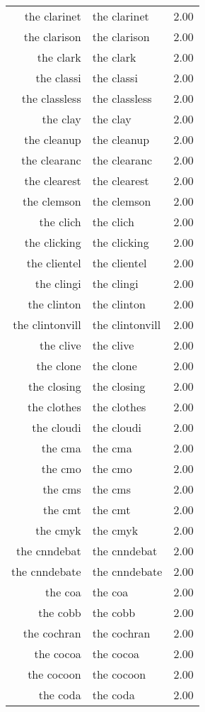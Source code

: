 \begin{table}[ht]
\begin{tabular}{rlr}
  the clarinet & the clarinet & 2.00 \\ 
  the clarison & the clarison & 2.00 \\ 
  the clark & the clark & 2.00 \\ 
  the classi & the classi & 2.00 \\ 
  the classless & the classless & 2.00 \\ 
  the clay & the clay & 2.00 \\ 
  the cleanup & the cleanup & 2.00 \\ 
  the clearanc & the clearanc & 2.00 \\ 
  the clearest & the clearest & 2.00 \\ 
  the clemson & the clemson & 2.00 \\ 
  the clich & the clich & 2.00 \\ 
  the clicking & the clicking & 2.00 \\ 
  the clientel & the clientel & 2.00 \\ 
  the clingi & the clingi & 2.00 \\ 
  the clinton & the clinton & 2.00 \\ 
  the clintonvill & the clintonvill & 2.00 \\ 
  the clive & the clive & 2.00 \\ 
  the clone & the clone & 2.00 \\ 
  the closing & the closing & 2.00 \\ 
  the clothes & the clothes & 2.00 \\ 
  the cloudi & the cloudi & 2.00 \\ 
  the cma & the cma & 2.00 \\ 
  the cmo & the cmo & 2.00 \\ 
  the cms & the cms & 2.00 \\ 
  the cmt & the cmt & 2.00 \\ 
  the cmyk & the cmyk & 2.00 \\ 
  the cnndebat & the cnndebat & 2.00 \\ 
  the cnndebate & the cnndebate & 2.00 \\ 
  the coa & the coa & 2.00 \\ 
  the cobb & the cobb & 2.00 \\ 
  the cochran & the cochran & 2.00 \\ 
  the cocoa & the cocoa & 2.00 \\ 
  the cocoon & the cocoon & 2.00 \\ 
  the coda & the coda & 2.00 \\ 

\end{tabular}
\end{table}
